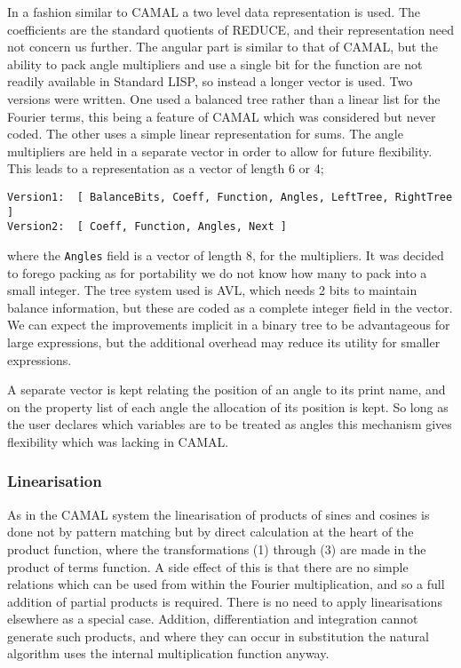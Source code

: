 In a fashion similar to CAMAL a two level data representation is used.
The coefficients are the standard quotients of REDUCE, and their
representation need not concern us further.  The angular part is
similar to that of CAMAL, but the ability to pack angle multipliers
and use a single bit for the function are not readily available in
Standard LISP, so instead a longer vector is used.  Two versions were
written.  One used a balanced tree rather than a linear list for the
Fourier terms, this being a feature of CAMAL which was considered but
never coded.  The other uses a simple linear representation for sums.
The angle multipliers are held in a separate vector in order to allow
for future flexibility.  This leads to a representation as a vector of
length 6 or 4;
\begin{verbatim}
Version1:  [ BalanceBits, Coeff, Function, Angles, LeftTree, RightTree ]
Version2:  [ Coeff, Function, Angles, Next ]
\end{verbatim}
where the \texttt{Angles} field is a vector of length 8, for the
multipliers.  It was decided to forego packing as for portability we
do not know how many to pack into a small integer.  The tree system
used is AVL, which needs 2 bits to maintain balance information, but
these are coded as a complete integer field in the vector.  We can
expect the improvements implicit in a binary tree to be advantageous
for large expressions, but the additional overhead may reduce its
utility for smaller expressions.

A separate vector is kept relating the position of an angle to its
print name, and on the property list of each angle the allocation of
its position is kept.  So long as the user declares which variables
are to be treated as angles this mechanism gives flexibility which was
lacking in CAMAL.

\subsubsection{Linearisation}

As in the CAMAL system the linearisation of products of sines and
cosines is done not by pattern matching but by direct calculation at
the heart of the product function, where the transformations (1)
through (3) are made in the product of terms function.  A side effect
of this is that there are no simple relations which can be used from
within the Fourier multiplication, and so a full addition of partial
products is required.  There is no need to apply linearisations
elsewhere as a special case.  Addition, differentiation and
integration cannot generate such products, and where they can occur in
substitution the natural algorithm uses the internal multiplication
function anyway.


